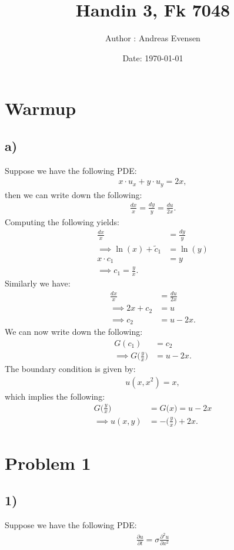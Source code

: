 \documentclass{article}
\title{Handin 3, Fk 7048}
\author{Author : Andreas Evensen}
\date{Date: \today}
\begin{document}
\maketitle
\section*{Warmup}

\subsection*{a)}
Suppose we have the following PDE:
\begin{align*}
    x\cdot u_x + y\cdot u_y = 2x,
\end{align*}then we can write down the following:
\begin{align*}
    \frac{dx}{x} = \frac{dy}{y} =\frac{du}{2x}.
\end{align*}Computing the following yields:
\begin{align*}
    \frac{dx}{x} &=\frac{dy}{y}\\
    \implies \ln(x) + \tilde{c}_1 &= \ln(y)\\
    x\cdot c_1 &= y\\
    \implies c_1 = \frac{y}{x}.
\end{align*}Similarly we have:
\begin{align*}
    \frac{dx}{x} &= \frac{du}{2x}\\
    \implies 2x + c_2 &= u\\
    \implies c_2 &= u - 2x.
\end{align*} We can now write down the following:
\begin{align*}
    G(c_1 ) &= c_2\\
    \implies G\Big(\frac{y}{x}\Big) &= u - 2x.
\end{align*}The boundary condition is given by:
\begin{align*}
    u(x, x^2) = x,
\end{align*}which implies the following:
\begin{align*}
    G\Big(\frac{y}{x}\Big)&=G\big(x\big) = u - 2x\\
    \implies u(x,y) &= -\Big(\frac{y}{x}\Big) + 2x.
\end{align*}

\section*{Problem 1}
\subsection*{1)}
Suppose we have the following PDE:
\begin{align*}
    \frac{\partial u}{\partial t} = \sigma \frac{\partial^2 u}{\partial x^2}
\end{align*}
\end{document}
